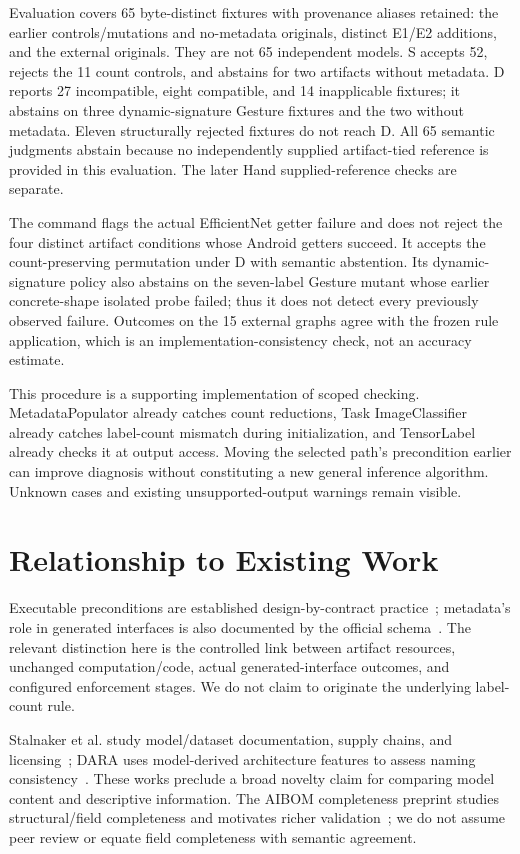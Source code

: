\documentclass[10pt,twocolumn,letterpaper]{article}
\begin{document}
Evaluation covers 65 byte-distinct fixtures with provenance aliases retained: the earlier controls/mutations and no-metadata originals, distinct E1/E2 additions, and the external originals. They are not 65 independent models. S accepts 52, rejects the 11 count controls, and abstains for two artifacts without metadata. D reports 27 incompatible, eight compatible, and 14 inapplicable fixtures; it abstains on three dynamic-signature Gesture fixtures and the two without metadata. Eleven structurally rejected fixtures do not reach D. All 65 semantic judgments abstain because no independently supplied artifact-tied reference is provided in this evaluation. The later Hand supplied-reference checks are separate.

The command flags the actual EfficientNet getter failure and does not reject the four distinct artifact conditions whose Android getters succeed. It accepts the count-preserving permutation under D with semantic abstention. Its dynamic-signature policy also abstains on the seven-label Gesture mutant whose earlier concrete-shape isolated probe failed; thus it does not detect every previously observed failure. Outcomes on the 15 external graphs agree with the frozen rule application, which is an implementation-consistency check, not an accuracy estimate.

This procedure is a supporting implementation of scoped checking. MetadataPopulator already catches count reductions, Task ImageClassifier already catches label-count mismatch during initialization, and TensorLabel already checks it at output access. Moving the selected path's precondition earlier can improve diagnosis without constituting a new general inference algorithm. Unknown cases and existing unsupported-output warnings remain visible.

\section{Relationship to Existing Work}
Executable preconditions are established design-by-contract practice~\cite{meyer}; metadata's role in generated interfaces is also documented by the official schema~\cite{schema}. The relevant distinction here is the controlled link between artifact resources, unchanged computation/code, actual generated-interface outcomes, and configured enforcement stages. We do not claim to originate the underlying label-count rule.

Stalnaker et al. study model/dataset documentation, supply chains, and licensing~\cite{stalnaker}; DARA uses model-derived architecture features to assess naming consistency~\cite{dara}. These works preclude a broad novelty claim for comparing model content and descriptive information. The AIBOM completeness preprint studies structural/field completeness and motivates richer validation~\cite{aibom}; we do not assume peer review or equate field completeness with semantic agreement.
\end{document}
